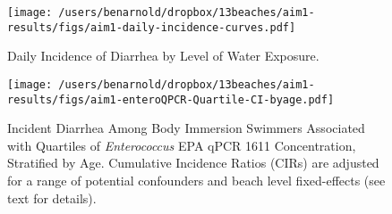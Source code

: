 \documentclass[11pt]{article}
\begin{document}
\begin{figure}[htbp]
\begin{center}
\texttt{[image: /users/benarnold/dropbox/13beaches/aim1-results/figs/aim1-daily-incidence-curves.pdf]}
\begin{minipage}{\textwidth}
\caption{Daily Incidence of Diarrhea by Level of Water Exposure.}
\label{fig:dailydiar}
\end{minipage}
\end{center}
\end{figure}


\begin{landscape}
\begin{figure}[htbp]
\begin{center}
\texttt{[image: /users/benarnold/dropbox/13beaches/aim1-results/figs/aim1-enteroQPCR-Quartile-CI-byage.pdf]} 
\begin{minipage}{1.2\textwidth}
\caption{Incident Diarrhea Among Body Immersion Swimmers Associated with Quartiles of \textit{Enterococcus} EPA qPCR 1611 Concentration, Stratified by Age. Cumulative Incidence Ratios (CIRs) are adjusted for a range of potential confounders and beach level fixed-effects (see text for details).}
\label{fig:qenteroqpcr}
\end{minipage}
\end{center}
\end{figure}
\end{landscape}
\end{document}
